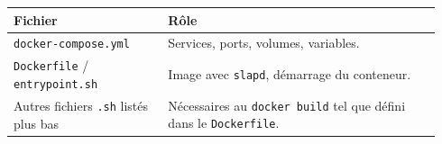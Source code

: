 \documentclass[11pt,a4paper]{report}
\begin{document}
\begin{tabular}{@{}p{0.34\linewidth}p{0.60\linewidth}@{}}
\toprule
\textbf{Fichier} & \textbf{Rôle} \\
\midrule
\texttt{docker-compose.yml} & Services, ports, volumes, variables. \\
\texttt{Dockerfile} / \texttt{entrypoint.sh} & Image avec \texttt{slapd}, démarrage du conteneur. \\
Autres fichiers \texttt{.sh} listés plus bas & Nécessaires au \texttt{docker build} tel que défini dans le \texttt{Dockerfile}. \\
\bottomrule
\end{tabular}


\end{document}
